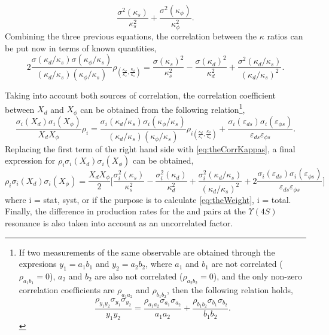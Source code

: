 \begin{enumerate}
\begin{equation}
\frac{\sigma^2(\kappa_s)}{\kappa_s^2} + \frac{\sigma^2(\kappa_\phi)}{\kappa_\phi^2}.
\end{equation}
%
Combining the three previous equations, the correlation between the $\kappa$ ratios can be put now in terms of known quantities,
%
\begin{equation}
\label{eq:theCorrKappas}
2\frac{\sigma(\kappa_d/\kappa_s)\sigma(\kappa_\phi/\kappa_s)}
{(\kappa_d/\kappa_s)(\kappa_\phi/\kappa_s)}
\rho_{\left(\frac{\kappa_d}{\kappa_s},\frac{\kappa_\phi}{\kappa_s}\right)}
= \frac{\sigma(\kappa_s)^2}{\kappa_s^2} - \frac{\sigma(\kappa_d)^2}{\kappa_d^2} +
\frac{\sigma^2(\kappa_d/\kappa_s)}{(\kappa_d/\kappa_s)^2}.
\end{equation}
\end{enumerate}
%
Taking into account both sources of correlation, the correlation coefficient between $X_d$ and $X_\phi$ can be obtained from the following relation\footnote{If two measurements of the same observable are obtained through the expresions $y_1 = a_1b_1$ and $y_2 = a_2b_2$, where $a_1$ and $b_1$ are not correlated ($\rho_{a_1b_1} = 0$), $a_2$ and $b_2$ are also not correlated ($\rho_{a_2b_2} = 0$), and the only non-zero correlation coefficients are $\rho_{a_1a_2}$ and $\rho_{b_1b_2}$, then the following relation holds,
%
\[
\frac{\rho_{y_1y_2}\sigma_{y_1}\sigma_{y_2}}{y_1y_2} =
\frac{\rho_{a_1a_2}\sigma_{a_1}\sigma_{a_2}}{a_1a_2} +
\frac{\rho_{b_1b_2}\sigma_{b_1}\sigma_{b_2}}{b_1b_2}.
\]
%
},
%
\begin{equation}
\frac{\sigma_{i}(X_d)\sigma_{i}(X_\phi)}{X_{d}X_{\phi}}\rho_i =
\frac{\sigma_i(\kappa_d/\kappa_s)\sigma_i(\kappa_\phi/\kappa_s)}
{(\kappa_d/\kappa_s)(\kappa_\phi/\kappa_s)}
\rho_{i\left(\frac{\kappa_d}{\kappa_s},\frac{\kappa_\phi}{\kappa_s}\right)} +
\frac{\sigma_i(\varepsilon_{ds})\sigma_i(\varepsilon_{{\phi}s})}
{\varepsilon_{ds}\varepsilon_{{\phi}s}}.
\end{equation}
%
Replacing the first term of the right hand side with \eqref{eq:theCorrKappas}, a final expression for $\rho_i\sigma_{i}(X_d)\sigma_{i}(X_\phi)$ can be obtained,
%
\begin{equation}
\rho_i\sigma_{i}(X_d)\sigma_{i}(X_\phi) =
\frac{X_{d}X_{\phi}}{2}\Bigg[{\frac{\sigma_i^2(\kappa_s)}{\kappa_s^2} -
\frac{\sigma_i^2(\kappa_d)}{\kappa_d^2} +
\frac{\sigma_i^2(\kappa_d/\kappa_s)}{(\kappa_d/\kappa_s)^2} +
2\frac{\sigma_i(\varepsilon_{ds})\sigma_i(\varepsilon_{{\phi}s})}
{\varepsilon_{ds}\varepsilon_{{\phi}s}}}\Bigg]
\end{equation}
where i = stat, syst, or if the purpose is to calculate \eqref{eq:theWeight}, i = total. Finally, the difference in production rates for the \Bu{}\Bub and \Bd{}\Bdb pairs at the $\Upsilon(4S)$ resonance is also taken into account as an uncorrelated factor.
%

